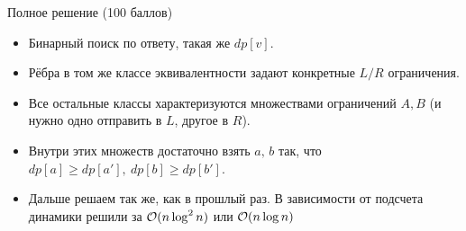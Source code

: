 \begin{frame}{Полное решение (100 баллов)}
  \begin{itemize}
  \item Бинарный поиск по ответу, такая же $dp[v]$.
  \item Рёбра в том же классе эквивалентности задают конкретные $L/R$ ограничения.
  \item Все остальные классы характеризуются множествами ограничений $A, B$ (и нужно одно отправить в $L$, другое в $R$).
  \item Внутри этих множеств достаточно взять $a,\,b$ так, что $dp[a] \ge dp[a'],\ dp[b] \ge dp[b']$.
  \item Дальше решаем так же, как в прошлый раз. В зависимости от подсчета динамики решили за $\mathcal{O}(n \log^2 n)$ или $\mathcal{O}(n \log n)$
  \end{itemize}
\end{frame}
